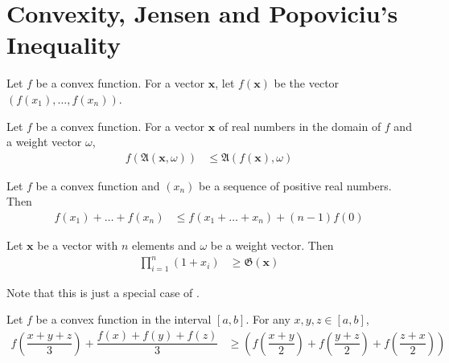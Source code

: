 \documentclass{subfile}
\begin{document}
	\section[Jensen and Popoviciu]{Convexity, Jensen and Popoviciu's Inequality}\label{sec:convexity}
	
	Let $f$ be a convex function. For a vector $\mathbf{x}$, let $f(\mathbf{x})$ be the vector $(f(x_{1}),\ldots,f(x_{n}))$.
		\begin{theorem}\label{thm:weightedjensen}
			Let $f$ be a convex function. For a vector $\mathbf{x}$ of real numbers in the domain of $f$ and a weight vector $\omega$,
				\begin{align*}
					f\left(\mathfrak{A}(\mathbf{x},\omega)\right)
						& \leq \mathfrak{A}(f(\mathbf{x}),\omega)
				\end{align*}
		\end{theorem}
	
		\begin{theorem}
			Let $f$ be a convex function and $(x_{n})$ be a sequence of positive real numbers. Then
				\begin{align*}
					f(x_{1})+\ldots+f(x_{n})
						& \leq f(x_{1}+\ldots+x_{n})+(n-1)f(0)
				\end{align*}
		\end{theorem}
	
		\begin{theorem}
			Let $\mathbf{x}$ be a vector with $n$ elements and $\omega$ be a weight vector. Then
				\begin{align*}
					\prod_{i=1}^{n}(1+x_{i})
						& \geq \mathfrak{G}(\mathbf{x})
				\end{align*}
		\end{theorem}
	Note that this is just a special case of .
		\begin{theorem}
			Let $f$ be a convex function in the interval $[a,b]$. For any $x,y,z\in[a,b]$,
				\begin{align*}
					f\left(\dfrac{x+y+z}{3}\right)+\dfrac{f(x)+f(y)+f(z)}{3}
						& \geq \left(f\left(\dfrac{x+y}{2}\right)+f\left(\dfrac{y+z}{2}\right)+f\left(\dfrac{z+x}{2}\right)\right)
				\end{align*}
		\end{theorem}
\end{document}
